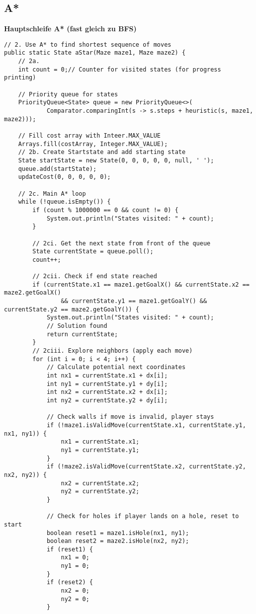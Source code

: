 \documentclass[a4paper,10pt,ngerman]{scrartcl}
\begin{document}
\subsection{A*}
\textbf{Hauptschleife A* (fast gleich zu BFS)}
\begin{lstlisting}
// 2. Use A* to find shortest sequence of moves
public static State aStar(Maze maze1, Maze maze2) {
    // 2a.
    int count = 0;// Counter for visited states (for progress printing)

    // Priority queue for states
    PriorityQueue<State> queue = new PriorityQueue<>(
            Comparator.comparingInt(s -> s.steps + heuristic(s, maze1, maze2)));

    // Fill cost array with Inteer.MAX_VALUE
    Arrays.fill(costArray, Integer.MAX_VALUE);
    // 2b. Create Startstate and add starting state
    State startState = new State(0, 0, 0, 0, 0, null, ' ');
    queue.add(startState);
    updateCost(0, 0, 0, 0, 0);

    // 2c. Main A* loop
    while (!queue.isEmpty()) {
        if (count % 1000000 == 0 && count != 0) {
            System.out.println("States visited: " + count);
        }

        // 2ci. Get the next state from front of the queue
        State currentState = queue.poll();
        count++;

        // 2cii. Check if end state reached
        if (currentState.x1 == maze1.getGoalX() && currentState.x2 == maze2.getGoalX()
                && currentState.y1 == maze1.getGoalY() && currentState.y2 == maze2.getGoalY()) {
            System.out.println("States visited: " + count);
            // Solution found
            return currentState;
        }
        // 2ciii. Explore neighbors (apply each move)
        for (int i = 0; i < 4; i++) {
            // Calculate potential next coordinates
            int nx1 = currentState.x1 + dx[i];
            int ny1 = currentState.y1 + dy[i];
            int nx2 = currentState.x2 + dx[i];
            int ny2 = currentState.y2 + dy[i];

            // Check walls if move is invalid, player stays
            if (!maze1.isValidMove(currentState.x1, currentState.y1, nx1, ny1)) {
                nx1 = currentState.x1;
                ny1 = currentState.y1;
            }
            if (!maze2.isValidMove(currentState.x2, currentState.y2, nx2, ny2)) {
                nx2 = currentState.x2;
                ny2 = currentState.y2;
            }

            // Check for holes if player lands on a hole, reset to start
            boolean reset1 = maze1.isHole(nx1, ny1);
            boolean reset2 = maze2.isHole(nx2, ny2);
            if (reset1) {
                nx1 = 0;
                ny1 = 0;
            }
            if (reset2) {
                nx2 = 0;
                ny2 = 0;
            }


\end{lstlisting}
\end{document}
